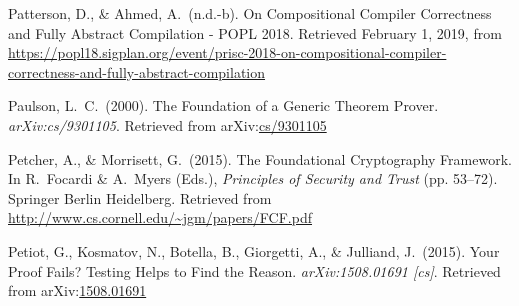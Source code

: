 \documentclass[12pt,twoside]{article}
\begin{document}
{\begin{thebibliography}{222}
\mdbibitemlabel{}Patterson, D., \& Ahmed, A.~(n.d.-b). On Compositional Compiler Correctness and Fully Abstract Compilation - POPL 2018. Retrieved February 1, 2019, from \href{https://popl18.sigplan.org/event/prisc-2018-on-compositional-compiler-correctness-and-fully-abstract-compilation}{{\ttfamily https://\hspace{0pt}popl18.\hspace{0pt}sigplan.\hspace{0pt}org/\hspace{0pt}event/\hspace{0pt}prisc-\hspace{0pt}2018-\hspace{0pt}on-\hspace{0pt}compositional-\hspace{0pt}compiler-\hspace{0pt}correctness-\hspace{0pt}and-\hspace{0pt}fully-\hspace{0pt}abstract-\hspace{0pt}compilation}}\label{patterson_compositional_nodate}%

\mdbibitemlabel{}Paulson, L.~C.~(2000). The Foundation of a Generic Theorem Prover. \emph{arXiv:cs/9301105}. Retrieved from arXiv:\href{http://arxiv.org/abs/cs/9301105}{cs/9301105}\label{paulson_foundation_2000}%

\mdbibitemlabel{}Petcher, A., \& Morrisett, G.~(2015). The Foundational Cryptography Framework. In R.~Focardi \& A.~Myers (Eds.), \emph{Principles of Security and Trust} (pp. 53–72). Springer Berlin Heidelberg. Retrieved from \href{http://www.cs.cornell.edu/~jgm/papers/FCF.pdf}{{\ttfamily http://\hspace{0pt}www.\hspace{0pt}cs.\hspace{0pt}cornell.\hspace{0pt}edu/\hspace{0pt}\textasciitilde{}jgm/\hspace{0pt}papers/\hspace{0pt}FCF.\hspace{0pt}pdf}}\label{petcher_foundational_2015}%

\mdbibitemlabel{}Petiot, G., Kosmatov, N., Botella, B., Giorgetti, A., \& Julliand, J.~(2015). Your Proof Fails? Testing Helps to Find the Reason. \emph{arXiv:1508.01691 {}[cs]}. Retrieved from arXiv:\href{http://arxiv.org/abs/1508.01691}{1508.01691}\label{petiot_your_2015}%


\end{thebibliography}}
\end{document}
